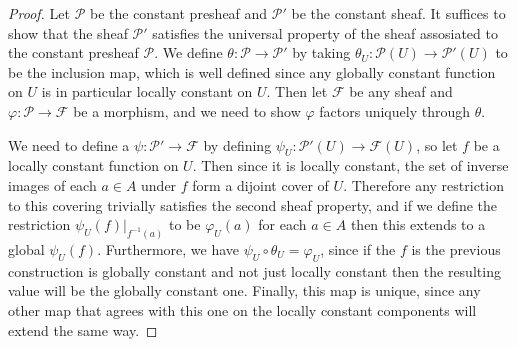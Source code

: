 \documentclass[11pt]{article}
\newcommand{\presheaf}{\mathcal{P}}
\newcommand{\sheaf}{\mathcal{F}}
\begin{document}
\begin{proof}
  Let $\presheaf$ be the constant presheaf and $\presheaf'$ be the constant sheaf.
  It suffices to show that the sheaf $\presheaf'$ satisfies the universal property of the sheaf assosiated to the constant presheaf $\presheaf$.
  We define $\theta : \presheaf \rightarrow \presheaf'$ by taking $\theta_U : \presheaf(U) \rightarrow \presheaf'(U)$ to be the inclusion map, which is well defined since any globally constant function on $U$ is in particular locally constant on $U$.
  Then let $\sheaf$ be any sheaf and $\varphi : \presheaf \rightarrow \sheaf$ be a morphism, and we need to show $\varphi$ factors uniquely through $\theta$.

  We need to define a  $\psi : \presheaf' \rightarrow \sheaf$ by defining $\psi_U : \presheaf'(U) \rightarrow \sheaf(U)$, so let $f$ be a locally constant function on $U$. Then since it is locally constant, the set of inverse images of each $a \in A$ under $f$ form a dijoint cover of $U$.
  Therefore any restriction to this covering trivially satisfies the second sheaf property, and if we define the restriction $\psi_U(f)|_{f^{-1}(a)}$ to be $\varphi_U(a)$ for each $a \in A$ then this extends to a global $\psi_U(f)$.
  Furthermore, we have $\psi_U \circ \theta_U = \varphi_U$, since if the $f$ is the previous construction is globally constant and not just locally constant then the resulting value will be the globally constant one.
  Finally, this map is unique, since any other map that agrees with this one on the locally constant components will extend the same way.
\end{proof}
\end{document}

